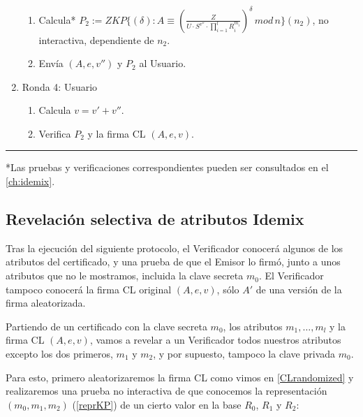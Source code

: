 \begin{algorithm}
\begin{enumerate}
\begin{enumerate}[label*=\arabic*.]
			\item Calcula* $P_2 := ZKP\{(\delta) : A \equiv \left( \frac{Z}{U\cdot S^{v''}\cdot \prod_{i=1}^{l} R_i^{m_i}} \right)^{\delta} \, mod \, n \}(n_2)$, no interactiva, dependiente de $n_2$.
			
			\item Envía $(A,e,v'')$ y $P_2$ al Usuario.
		\end{enumerate}
		
		
		\item Ronda 4: Usuario
		\begin{enumerate}[label*=\arabic*.]
			\item Calcula $v=v'+v''$.
			\item Verifica $P_2$ y la firma CL $(A,e,v)$.
		\end{enumerate}

	\end{enumerate}
	
\end{algorithm}
\rule{\textwidth}{1pt}



\begin{flushleft}
	*Las pruebas y verificaciones correspondientes pueden ser consultados en el \autoref{ch:idemix}.
\end{flushleft}



\subsection{Revelación selectiva de atributos Idemix}

Tras la ejecución del siguiente protocolo, el Verificador conocerá algunos de los atributos del certificado, y una prueba de que el Emisor lo firmó, junto a unos atributos que no le mostramos, incluida la clave secreta $m_0$. El Verificador tampoco conocerá la firma CL original $(A,e,v)$, sólo $A'$ de una versión de la firma aleatorizada.

Partiendo de un certificado con la clave secreta $m_0$, los atributos $m_1,\dots,m_l$ y la firma CL $(A,e,v)$, vamos a revelar a un Verificador todos nuestros atributos excepto los dos primeros, $m_1$ y $m_2$, y por supuesto, tampoco la clave privada $m_0$.

Para esto, primero aleatorizaremos la firma CL como vimos en \ref{CLrandomized} y realizaremos una prueba no interactiva de que conocemos la representación $(m_0,m_1,m_2)$ (\ref{reprKP}) de un cierto valor en la base $R_0$, $R_1$ y $R_2$:

